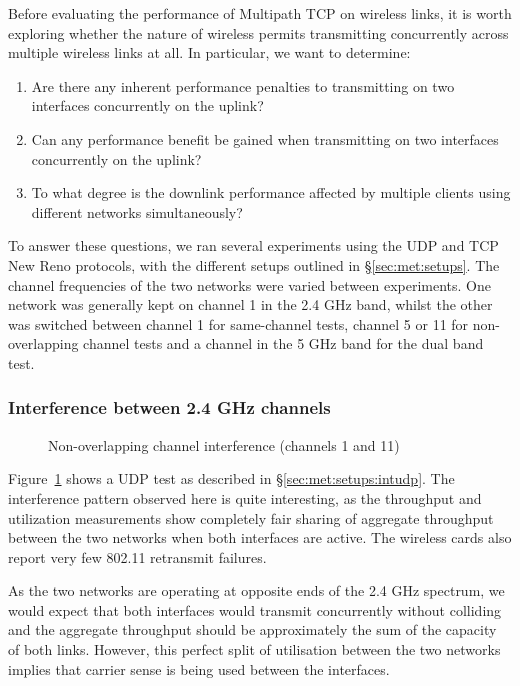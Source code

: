 Before evaluating the performance of Multipath TCP on wireless links, it is
worth exploring whether the nature of wireless permits transmitting concurrently
across multiple wireless links at all. In particular, we want to determine:

\begin{enumerate}
  \item Are there any inherent performance penalties to transmitting on two
    interfaces concurrently on the uplink?
  \item Can any performance benefit be gained when transmitting on two
    interfaces concurrently on the uplink?
  \item To what degree is the downlink performance affected by multiple clients
    using different networks simultaneously?
\end{enumerate}

To answer these questions, we ran several experiments using the UDP and TCP New 
Reno protocols, with the different setups outlined in \S\ref{sec:met:setups}.      %
The channel frequencies of the two networks were varied between experiments. One
network was generally kept on channel 1 in the 2.4 GHz band, whilst the other
was switched between channel 1 for same-channel tests, channel 5 or 11 for
non-overlapping channel tests and a channel in the 5 GHz band for the dual band 
test. 

\subsubsection{Interference between 2.4 GHz channels}

\begin{figure}[h]
 \centering
 
 \caption{Non-overlapping channel interference (channels 1 and 11)}\label{graph:cc-interference}
\end{figure}

Figure~\ref{graph:cc-interference} shows a UDP test as described in 
\S\ref{sec:met:setups:intudp}.
The interference pattern observed here is quite interesting, as the throughput
and utilization measurements show completely fair sharing of aggregate
throughput between the two networks when both interfaces are active. The
wireless cards also report very few 802.11 retransmit failures.

As the two networks are operating at opposite ends of the 2.4 GHz spectrum, we
would expect that both interfaces would transmit concurrently without colliding
and the aggregate throughput should be approximately the sum of the capacity of
both links. However, this perfect split of utilisation between the two networks
implies that carrier sense is being used between the interfaces.

